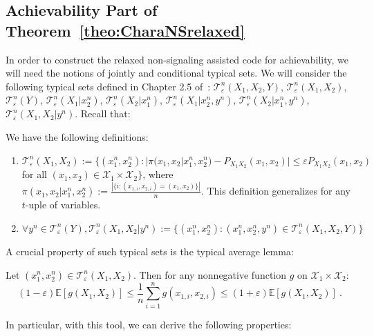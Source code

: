       \subsection{Achievability Part of Theorem~\ref{theo:CharaNSrelaxed}}
      In order to construct the relaxed non-signaling assisted code for achievability, we will need the notions of jointly and conditional typical sets. We will consider the following typical sets defined in Chapter 2.5 of~\cite{GK11}: $\mathcal{T}^n_{\varepsilon}(X_1,X_2,Y)$, $\mathcal{T}^n_{\varepsilon}(X_1,X_2)$, $\mathcal{T}^n_{\varepsilon}(Y)$, $\mathcal{T}^n_{\varepsilon}(X_1|x_2^n)$, $\mathcal{T}^n_{\varepsilon}(X_2|x_1^n)$, $\mathcal{T}^n_{\varepsilon}(X_1|x_2^n,y^n)$, $\mathcal{T}^n_{\varepsilon}(X_2|x_1^n,y^n)$, $\mathcal{T}^n_{\varepsilon}(X_1,X_2|y^n)$. Recall that:
      \begin{definition}
        We have the following definitions:
        \begin{enumerate}
        \item $\mathcal{T}^n_{\varepsilon}(X_1,X_2) := \{(x_1^n,x_2^n) : |\pi(x_1,x_2|x_1^n,x_2^n) - P_{X_1X_2}(x_1,x_2)|\leq \varepsilon P_{X_1X_2}(x_1,x_2)$ for all $(x_1,x_2) \in \mathcal{X}_1 \times \mathcal{X}_2\}$, where $\pi(x_1,x_2|x_1^n,x_2^n) := \frac{|\{i : (x_{1,i},x_{2,i}) = (x_1,x_2)\}|}{n}$. This definition generalizes for any $t$-uple of variables.
    \item $\forall y^n \in \mathcal{T}^n_{\varepsilon}(Y), \mathcal{T}^n_{\varepsilon}(X_1,X_2|y^n) := \{ (x_1^n,x_2^n) : (x_1^n,x_2^n,y^n) \in \mathcal{T}^n_{\varepsilon}(X_1,X_2,Y) \}$
        \end{enumerate}
      \end{definition}

      A crucial property of such typical sets is the typical average lemma:

      \begin{lemma}
        Let $(x_1^n,x_2^n) \in \mathcal{T}^n_{\varepsilon}(X_1,X_2)$. Then for any nonnegative function $g$ on $\mathcal{X}_1\times\mathcal{X}_2$:
        \[ (1-\varepsilon)\mathbb{E}[g(X_1,X_2)] \leq \frac{1}{n}\sum_{i=1}^ng(x_{1,i},x_{2,i}) \leq (1+\varepsilon)\mathbb{E}[g(X_1,X_2)] \ . \]
      \end{lemma}
      
      In particular, with this tool, we can derive the following properties:
      
